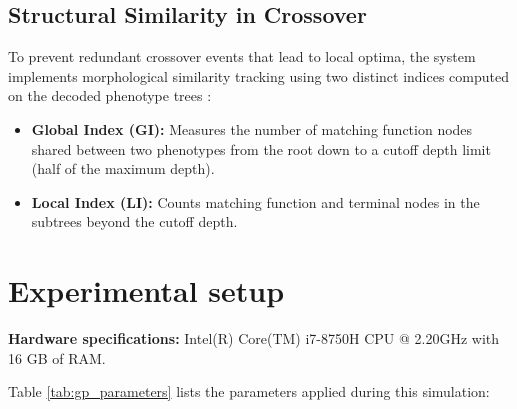 \documentclass[12pt]{article}
\begin{document}
    \subsection{Structural Similarity in Crossover}
    To prevent redundant crossover events that lead to local optima, the system implements morphological similarity tracking using two distinct indices computed on the decoded phenotype trees \cite{kapoor2023}:
    \begin{itemize}
        \item \textbf{Global Index (GI):} Measures the number of matching function nodes shared between two phenotypes from the root down to a cutoff depth limit (half of the maximum depth).
        \item \textbf{Local Index (LI):} Counts matching function and terminal nodes in the subtrees beyond the cutoff depth.
    \end{itemize}

\section{Experimental setup} \label{sec:exp_setup}
    \newcommand{\PopSize}{100}
    \newcommand{\NoGens}{70}
    \newcommand{\MaxDepth}{5}
    \newcommand{\FitnessFunc}{Mean Absolute Percentage Error (MAPE)}
    \newcommand{\TestCases}{30 days sliding window chunk offsets}
    \newcommand{\SMethod}{Tournament Selection}
    \newcommand{\TournSize}{2}
    \newcommand{\PopMethod}{Sensible Ramped half-and-half}
    \newcommand{\MRate}{19\% (19 individuals per 100)}
    \newcommand{\CRate}{80\% (80 individuals per 100)}
    \newcommand{\RRate}{1\% (1 individual per 100)}
    
    \textbf{Hardware specifications:} Intel(R) Core(TM) i7-8750H CPU @ 2.20GHz with 16 GB of RAM.
   
    Table \ref{tab:gp_parameters} lists the parameters applied during this simulation:
  
\end{document}
